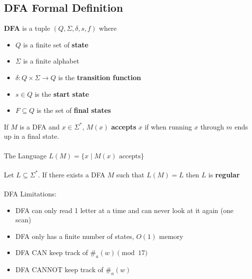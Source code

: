 \documentclass{article}
\begin{document}
  \subsection{DFA Formal Definition}
  \textbf{DFA} is a tuple $(Q, \Sigma, \delta, s, f)$ where
  \begin{itemize}
    \item $Q$ is a finite set of \textbf{state}
    \item $\Sigma$ is a finite alphabet
    \item $\delta \colon Q \times \Sigma \rightarrow Q$ is the \textbf{transition function}
    \item $s \in Q$ is the \textbf{start state}
    \item $F \subseteq Q$ is the set of \textbf{final states}
  \end{itemize}
  If $M$ is a DFA and $x \in \Sigma^*$, $M(x)$ \textbf{accepts} $x$ if when running $x$ through $m$ ends up in a final state. \\ \\
  The Language $L(M) = \{x \mid M(x) \text{ accepts}\}$ \\ \\
  Let $L \subseteq \Sigma^*$. If there exists a DFA $M$ such that $L(M) = L$ then $L$ is \textbf{regular} \\ \\
  DFA Limitations:
  \begin{itemize}
    \item DFA can only read 1 letter at a time and can never look at it again (one scan)
    \item DFA only has a finite number of states, $O(1)$ memory
    \item  DFA CAN keep track of $\#_a(w) \pmod{17}$
    \item DFA CANNOT keep track of $\#_a(w)$
  \end{itemize}
\end{document}
